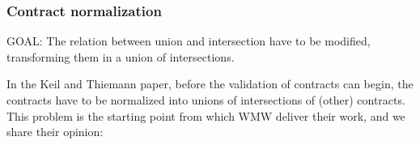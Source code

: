 








\subsubsection{Contract normalization}

GOAL: The relation between union and intersection have to be modified, transforming them
in a union of intersections.

In the Keil and Thiemann paper, before the validation of contracts can begin, the
contracts have to be normalized into unions of intersections of (other) contracts.
This problem  is the starting point from which
WMW deliver their work, and we share their opinion:

